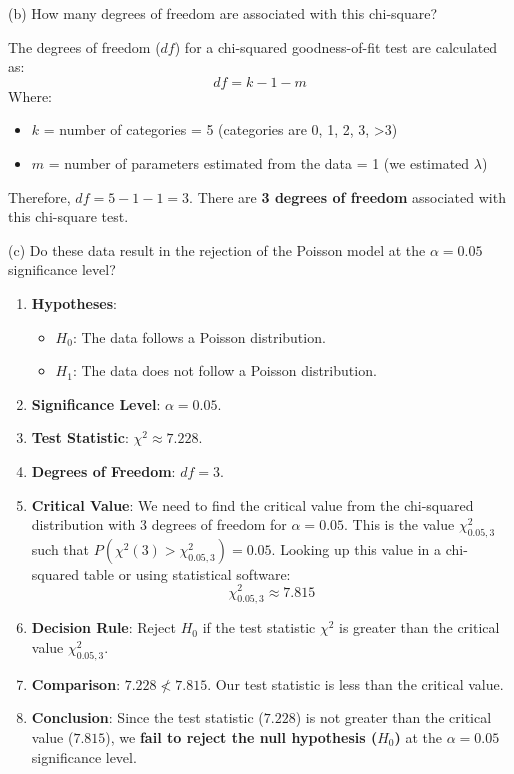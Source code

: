(b) How many degrees of freedom are associated with this chi-square?

The degrees of freedom ($df$) for a chi-squared goodness-of-fit test are calculated as:
\[
df = k - 1 - m
\]
Where:

\begin{itemize}
	\item $k$ = number of categories = 5 (categories are 0, 1, 2, 3, >3)
	\item $m$ = number of parameters estimated from the data = 1 (we estimated $\lambda$)
\end{itemize}

Therefore, $df = 5 - 1 - 1 = 3$.
There are \textbf{3 degrees of freedom} associated with this chi-square test.

(c) Do these data result in the rejection of the Poisson model at the $\alpha=0.05$ significance level?

\begin{enumerate}
	\item \textbf{Hypotheses}:
	\begin{itemize}
		\item $H_0$: The data follows a Poisson distribution.
		\item $H_1$: The data does not follow a Poisson distribution.
	\end{itemize}
	\item \textbf{Significance Level}: $\alpha = 0.05$.
	\item \textbf{Test Statistic}: $\chi^2 \approx 7.228$.
	\item \textbf{Degrees of Freedom}: $df = 3$.
	\item \textbf{Critical Value}: We need to find the critical value from the chi-squared distribution with 3 degrees of freedom for $\alpha = 0.05$. This is the value $\chi^2_{0.05, 3}$ such that $P(\chi^2(3) > \chi^2_{0.05, 3}) = 0.05$. Looking up this value in a chi-squared table or using statistical software:
\[
\chi^2_{0.05, 3} \approx 7.815
\]	\item \textbf{Decision Rule}: Reject $H_0$ if the test statistic $\chi^2$ is greater than the critical value $\chi^2_{0.05, 3}$.
	\item \textbf{Comparison}: $7.228 \nless 7.815$. Our test statistic is less than the critical value.
	\item \textbf{Conclusion}: Since the test statistic ($7.228$) is not greater than the critical value ($7.815$), we \textbf{fail to reject the null hypothesis ($H_0$)} at the $\alpha=0.05$ significance level.
\end{enumerate}

